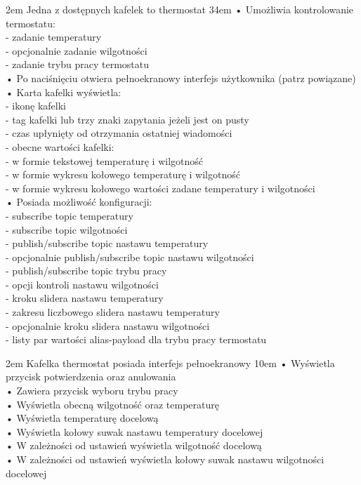 {2em}{
    Jedna z dostępnych kafelek to thermostat
}
{34em}{
    • Umożliwia kontrolowanie termostatu:\\
    - zadanie temperatury\\
    - opcjonalnie zadanie wilgotności\\
    - zadanie trybu pracy termostatu\\

    • Po naciśnięciu otwiera pełnoekranowy interfejs użytkownika (patrz powiązane)\\

    • Karta kafelki wyświetla:\\
    - ikonę kafelki\\
    - tag kafelki lub trzy znaki zapytania jeżeli jest on pusty\\
    - czas upłynięty od otrzymania ostatniej wiadomości\\
    - obecne wartości kafelki:\\
    \hspace*{0.5em} - w formie tekstowej temperaturę i wilgotność\\
    \hspace*{0.5em} - w formie wykresu kołowego temperaturę i wilgotność\\
    \hspace*{0.5em} - w formie wykresu kołowego wartości zadane temperatury i wilgotności\\

    • Posiada możliwość konfiguracji:\\
    - subscribe topic temperatury\\
    - subscribe topic wilgotności\\
    - publish/subscribe topic nastawu temperatury\\
    - opcjonalnie publish/subscribe topic nastawu wilgotności\\
    - publish/subscribe topic trybu pracy\\
    - opcji kontroli nastawu wilgotności\\
    - kroku slidera nastawu temperatury\\
    - zakresu liczbowego slidera nastawu temperatury\\
    - opcjonalnie kroku slidera nastawu wilgotności\\
    - listy par wartości alias-payload dla trybu pracy termostatu
}

{2em}{
    Kafelka thermostat posiada interfejs pełnoekranowy}
{10em}{
    • Wyświetla przycisk potwierdzenia oraz anulowania\\
    • Zawiera przycisk wyboru trybu pracy\\
    • Wyświetla obecną wilgotność oraz temperaturę\\
    • Wyświetla temperaturę docelową\\
    • Wyświetla kołowy suwak nastawu temperatury docelowej\\
    • W zależności od ustawień wyświetla wilgotność docelową\\
    • W zależności od ustawień wyświetla kołowy suwak nastawu wilgotności docelowej
}

